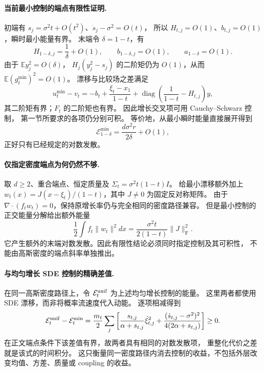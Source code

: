 \documentclass[UTF8,a4paper,11pt,fontset=fandol]{ctexart}
\begin{document}
\paragraph{当前最小控制的端点有限性证明.}
初端有 $s_j=\sigma^2t+O(t^2)$、$\dot s_j-\sigma^2=O(t)$，
所以 $H_{t,j}=O(1)$、$b_{t,j}=O(1)$，瞬时最小能量有界。
末端令 $\delta=1-t$，有
\begin{equation}
H_{1-\delta,j}=\frac1\delta+O(1),\qquad
b_{1-\delta,j}=O(1),\qquad a_{1-\delta}=O(1).
\end{equation}
由于 $\mathbb E y_j^2=O(\delta)$，
$H_j(y_j^2-s_j)$ 的二阶矩仍为 $O(1)$，从而
$\mathbb E(g_t^{\min})^2=O(1)$。
漂移与比较场之差满足
\begin{equation}
u_t^{\min}-v_t
=-b_t+\frac{\xi_t-x_1}{1-t}
+\operatorname{diag}\!\left(\frac1{1-t}-H_{t,j}\right)y,
\end{equation}
其二阶矩有界；$F_t$ 的二阶矩也有界。
因此增长交叉项可用 Cauchy--Schwarz 控制，
第一节所要求的各项仍分别可积。
等价地，从最小瞬时能量直接展开得到
\begin{equation}
\mathcal E_{1-\delta}^{\min}
=\frac{d\sigma^2r}{2\delta}+O(1),
\end{equation}
正好只有已经规定的对数发散。

\paragraph{仅指定密度端点为何仍然不够.}
取 $d\ge2$、重合端点、恒定质量及 $\Sigma_t=\sigma^2t(1-t)I$。
给最小漂移额外加上 $w_t(x)=J(x-\xi_t)/(1-t)$，其中 $J\ne0$ 为固定反对称矩阵。
由于 $\nabla\cdot(f_tw_t)=0$，保持原增长率仍与完全相同的密度路径兼容。
但是最小控制的正交能量分解给出额外能量
\begin{equation}
\frac12\int f_t\|w_t\|^2dx
=\frac{\sigma^2t}{2(1-t)}\|J\|_{\mathrm F}^2.
\end{equation}
它产生额外的末端对数发散。因此有限性结论必须同时指定控制及其可积性，
不能由高斯密度的端点斜率单独推出。

\paragraph{与均匀增长 SDE 控制的精确差值.}
在同一高斯密度路径上，令 $\mathcal E_t^{\rm unif}$ 为上述均匀增长控制的能量。
这里两者都使用 SDE 漂移，而非将概率流速度代入动能。
逐项相减得到
\begin{equation}
\mathcal E_t^{\rm unif}-\mathcal E_t^{\min}
=\frac{m_t}{2}\sum_j\left[
\frac{s_{t,j}}{\alpha+s_{t,j}}\dot\xi_{t,j}^2
+\frac{(\dot s_{t,j}-\sigma^2)^2}{4(2\alpha+s_{t,j})}\right]\ge0.
\label{eq:uniform-minimal-energy-gap}
\end{equation}
在正文端点条件下该差值有界，故两者具有相同的对数发散项，
重整化代价之差就是该式的时间积分。
这只衡量同一密度路径内消去控制的收益，不包括外层改变均值、方差、质量或 coupling 的收益。
\end{document}
